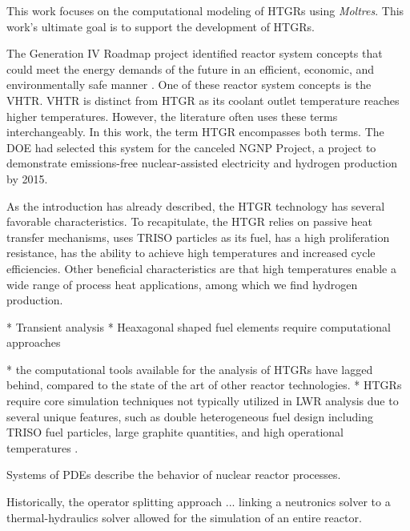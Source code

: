 \documentclass[11pt,letterpaper]{article}
\begin{document}
This work focuses on the computational modeling of \glspl{HTGR} using \textit{Moltres}.
This work's ultimate goal is to support the development of \glspl{HTGR}.

The Generation IV Roadmap project identified reactor system concepts that could meet the energy demands of the future in an efficient, economic, and environmentally safe manner \cite{macdonald_ngnp_2003}.
One of these reactor system concepts is the \gls{VHTR}.
\gls{VHTR} is distinct from \gls{HTGR} as its coolant outlet temperature reaches higher temperatures.
However, the literature often uses these terms interchangeably.
In this work, the term \gls{HTGR} encompasses both terms.
The \gls{DOE} had selected this system for the canceled \gls{NGNP} Project, a project to demonstrate emissions-free nuclear-assisted electricity and hydrogen production by 2015.

As the introduction has already described, the \gls{HTGR} technology has several favorable characteristics.
To recapitulate, the \gls{HTGR} relies on passive heat transfer mechanisms, uses TRISO particles as its fuel, has a high proliferation resistance, has the ability to achieve high temperatures and increased cycle efficiencies.
Other beneficial characteristics are that high temperatures enable a wide range of process heat applications, among which we find hydrogen production.

* Transient analysis
* Heaxagonal shaped fuel elements require computational approaches

* the computational tools available for the analysis of \glspl{HTGR} have lagged behind, compared to the state of the art of other reactor technologies.
* \glspl{HTGR} require core simulation techniques not typically utilized in \gls{LWR} analysis due to several unique features, such as double heterogeneous fuel design including \gls{TRISO} fuel particles, large graphite quantities, and high operational temperatures \cite{bostelmann_criticality_2016}.



Systems of \glspl{PDE} describe the behavior of nuclear reactor processes.

Historically, the operator splitting approach ...
linking a neutronics solver to a thermal-hydraulics solver allowed for the simulation of an entire reactor.
\end{document}

